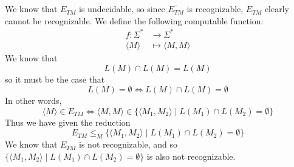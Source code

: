 \documentclass{article}
\begin{document}
\section{} %
We know that $E_{TM}$ is undecidable, so since $\overline{E_{TM}}$ is
recognizable, $E_{TM}$ clearly cannot be recognizable.
\newline
\newline
We define the following computable function:
\begin{align*}
	f:\Sigma^*&\longrightarrow\Sigma^*\\
	\langle M\rangle&\longmapsto\langle M,M\rangle
\end{align*}
We know that
\[L(M)\cap L(M)=L(M)\]
so it must be the case that
\[L(M)=\emptyset\Longleftrightarrow L(M)\cap L(M)=\emptyset\]
In other words,
\[\langle M\rangle\in E_{TM}\Longleftrightarrow\langle M,M\rangle\in\{\langle M_1,M_2\rangle\mid L(M_1)\cap L(M_2)=\emptyset\}\]
Thus we have given the reduction
\[E_{TM}\le_M\{\langle M_1,M_2\rangle\mid L(M_1)\cap L(M_2)=\emptyset\}\]
We know that $E_{TM}$ is not recognizable, and so
$\{\langle M_1,M_2\rangle\mid L(M_1)\cap L(M_2)=\emptyset\}$ is also not
recognizable.
\end{document}
